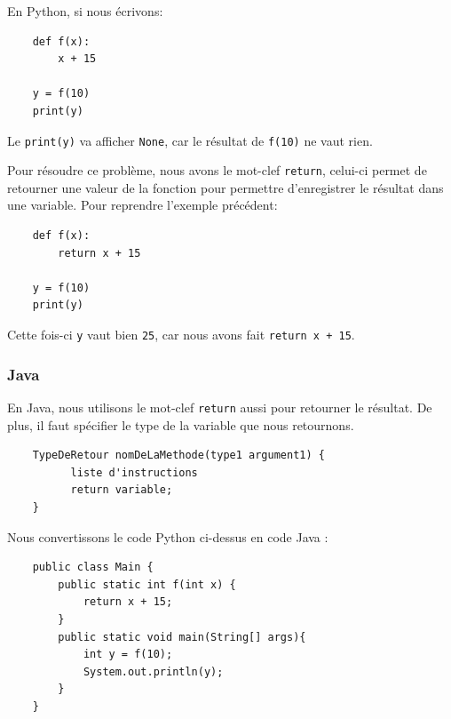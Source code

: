 En Python, si nous écrivons: 

\begin{verbatim}
    def f(x):
        x + 15
        
    y = f(10)
    print(y)
\end{verbatim}
    
Le \lstinline{print(y)} va afficher \lstinline{None}, car le résultat de \lstinline{f(10)} ne vaut rien.

Pour résoudre ce problème, nous avons le mot-clef \lstinline{return}, celui-ci permet de retourner une valeur de la fonction pour permettre d'enregistrer le résultat dans une variable. Pour reprendre l'exemple précédent: 
\begin{verbatim}
    def f(x):
        return x + 15
        
    y = f(10)
    print(y)
\end{verbatim}
    
Cette fois-ci \lstinline{y} vaut bien \lstinline{25}, car nous avons fait \lstinline{return x + 15}.

\subsubsection{Java}

En Java, nous utilisons le mot-clef \lstinline{return} aussi pour retourner le résultat. De plus, il faut spécifier le type de la variable que nous retournons.

\begin{verbatim}
    TypeDeRetour nomDeLaMethode(type1 argument1) {
          liste d'instructions
          return variable;
    }
\end{verbatim}

Nous convertissons le code Python ci-dessus en code Java :

\begin{verbatim}
    public class Main {
        public static int f(int x) {
            return x + 15; 
        }
        public static void main(String[] args){
            int y = f(10);
            System.out.println(y);
        }
    }
\end{verbatim}

